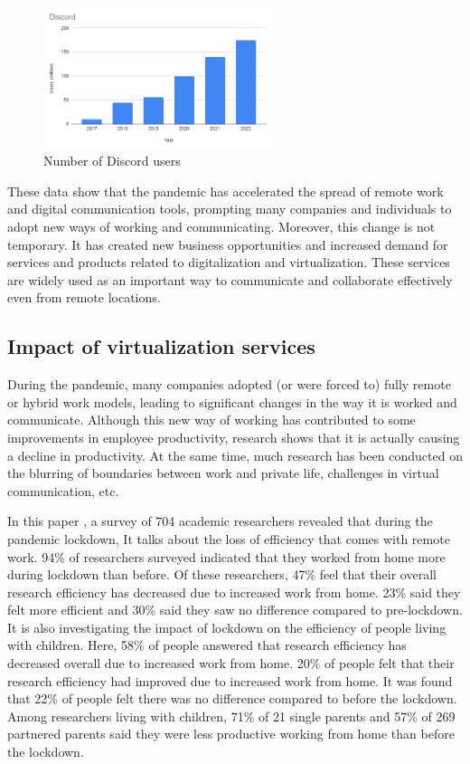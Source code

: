 \documentclass[12pt]{article}
\begin{document}
\begin{figure}[H]
    \centering
    \includegraphics[width=0.6\textwidth]{discord.png}
    \caption{Number of Discord users}
    \label{fig:my_label}
\end{figure}

These data show that the pandemic has accelerated the spread of remote work and
digital communication tools, prompting many companies and individuals to adopt
new ways of working and communicating. Moreover, this change is not temporary.
It has created new business opportunities and increased demand for services and
products related to digitalization and virtualization. These services are
widely used as an important way to communicate and collaborate effectively even
from remote locations.

\subsection{Impact of virtualization services}
During the pandemic, many companies adopted (or were forced to) fully remote or
hybrid work models, leading to significant changes in the way it is worked and
communicate. Although this new way of working has contributed to some
improvements in employee productivity, research shows that it is actually
causing a decline in productivity. At the same time, much research has been
conducted on the blurring of boundaries between work and private life,
challenges in virtual communication, etc.

In this paper \cite{10.1371/journal.pone.0249127}, a survey of 704 academic
researchers revealed that
during the pandemic lockdown,
It talks about the loss of efficiency that comes with remote work. 94\% of
researchers surveyed indicated that they worked from home more during lockdown
than before. Of these researchers, 47\% feel that their overall research
efficiency has decreased due to increased work from home. 23\% said they felt
more efficient and 30\% said they saw no difference compared to pre-lockdown.
It is also investigating the impact of lockdown on the efficiency of people
living with children. Here, 58\% of people answered that research efficiency
has decreased overall due to increased work from home. 20\% of people felt that
their research efficiency had improved due to increased work from home. It was
found that 22\% of people felt there was no difference compared to before the
lockdown. Among researchers living with children, 71\% of 21 single parents and
57\% of 269 partnered parents said they were less productive working from home
than before the lockdown.
\end{document}
